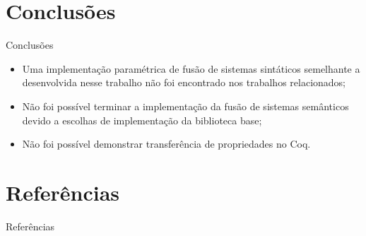 \documentclass[xcolor=table]{beamer}
\begin{document}
    \section[]{Conclusões}
    \begin{frame}{Conclusões}
        \begin{itemize}
            \item Uma implementação paramétrica de fusão de sistemas sintáticos semelhante a desenvolvida nesse trabalho não foi encontrado nos trabalhos relacionados;
            \item Não foi possível terminar a implementação da fusão de sistemas semânticos devido a escolhas de implementação da biblioteca base;
            \item Não foi possível demonstrar transferência de propriedades no Coq.%
        \end{itemize}
    \end{frame}

    \section[]{Referências}
    \begin{frame}[allowframebreaks]{Referências}
        
    \end{frame}
\end{document}
